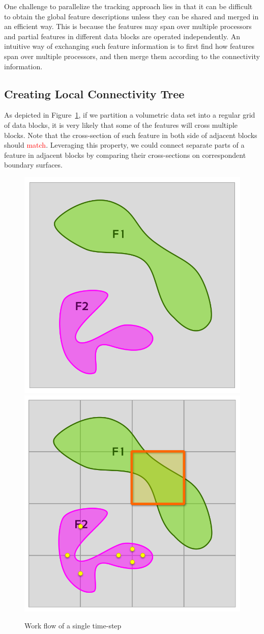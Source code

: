 \documentclass[10pt, conference, compsocconf]{IEEEtran}
\begin{document}
One challenge to parallelize the tracking approach lies in that it can be difficult to obtain the global feature descriptions unless they can be shared and merged in an efficient way. This is because the features may span over multiple processors and partial features in different data blocks are operated independently. An intuitive way of exchanging such feature information is to first find how features span over multiple processors, and then merge them according to the connectivity information.

\subsection{Creating Local Connectivity Tree}

As depicted in Figure~\ref{fig:partition}, if we partition a volumetric data set into a regular grid of data blocks, it is very likely that some of the features will cross multiple blocks. Note that the cross-section of such feature in both side of adjacent blocks should \textcolor{red}{match}. Leveraging this property, we could connect separate parts of a feature in adjacent blocks by comparing their cross-sections on correspondent boundary surfaces.

\begin{figure}[ht]
	\centering
	\includegraphics[width=0.45\linewidth]{partition0.png}
	\includegraphics[width=0.45\linewidth]{partition.png}
	\caption{Work flow of a single time-step}
	\label{fig:partition}
\end{figure}
\end{document}
